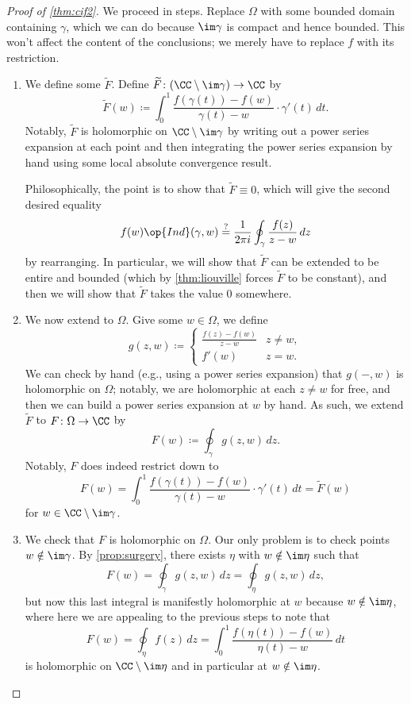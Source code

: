 \begin{proof}[Proof of \autoref{thm:cif2}]
	We proceed in steps. Replace $\Omega$ with some bounded domain containing $\gamma$, which we can do because $\im\gamma$ is compact and hence bounded. This won't affect the content of the conclusions; we merely have to replace $f$ with its restriction.
	\begin{enumerate}
		\item We define some $\widetilde F$. Define $\widetilde F\colon (\CC\setminus\im\gamma)\to\CC$ by
		\[\widetilde F(w)\coloneqq \int_0^1\frac{f(\gamma(t))-f(w)}{\gamma(t)-w}\cdot\gamma'(t)\,dt.\]
		Notably, $\widetilde F$ is holomorphic on $\CC\setminus\im\gamma$ by writing out a power series expansion at each point and then integrating the power series expansion by hand using some local absolute convergence result.

		Philosophically, the point is to show that $\widetilde F\equiv0$, which will give the second desired equality
		\[f(w)\op{Ind}(\gamma,w)\stackrel?=\frac1{2\pi i}\oint_\gamma\frac{f(z)}{z-w}\,dz\]
		by rearranging. In particular, we will show that $\widetilde F$ can be extended to be entire and bounded (which by \autoref{thm:liouville} forces $\widetilde F$ to be constant), and then we will show that $\widetilde F$ takes the value $0$ somewhere.

		\item We now extend to $\Omega$. Give some $w\in\Omega$, we define
		\[g(z,w)\coloneqq \begin{cases}
			\frac{f(z)-f(w)}{z-w} & z\ne w, \\
			f'(w) & z=w.
		\end{cases}\]
		We can check by hand (e.g., using a power series expansion) that $g(-,w)$ is holomorphic on $\Omega$; notably, we are holomorphic at each $z\ne w$ for free, and then we can build a power series expansion at $w$ by hand. As such, we extend $\widetilde F$ to $F\colon \Omega\to\CC$ by
		\[F(w)\coloneqq \oint_\gamma g(z,w)\,dz.\]
		Notably, $F$ does indeed restrict down to
		\[F(w)=\int_0^1\frac{f(\gamma(t))-f(w)}{\gamma(t)-w}\cdot\gamma'(t)\,dt=\widetilde F(w)\]
		for $w\in\CC\setminus\im\gamma$.

		\item We check that $F$ is holomorphic on $\Omega$. Our only problem is to check points $w\notin\im\gamma$. By \autoref{prop:surgery}, there exists $\eta$ with $w\notin\im\eta$ such that
		\[F(w)=\oint_\gamma g(z,w)\,dz=\oint_\eta g(z,w)\,dz,\]
		but now this last integral is manifestly holomorphic at $w$ because $w\notin\im\eta$, where here we are appealing to the previous steps to note that
		\[F(w)=\oint_\eta f(z)\,dz=\int_0^1\frac{f(\eta(t))-f(w)}{\eta(t)-w}\,dt\]
		is holomorphic on $\CC\setminus\im\eta$ and in particular at $w\notin\im\eta$.


\end{enumerate}
\end{proof}
